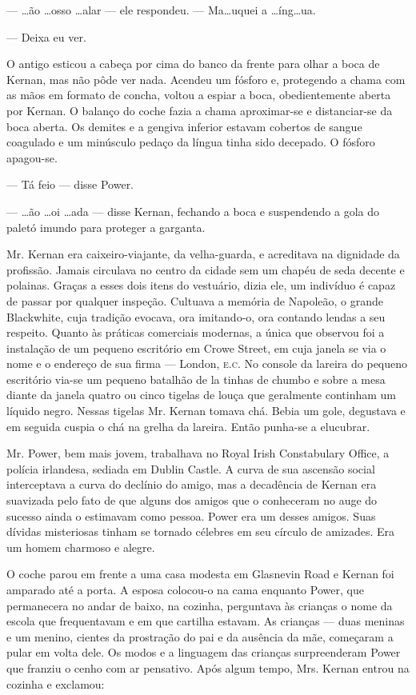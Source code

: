 --- \ldots{}ão \ldots{}osso \ldots{}alar --- ele respondeu. --- Ma\ldots{}uquei a
\ldots{}íng\ldots{}ua.

--- Deixa eu ver.

O antigo esticou a cabeça por cima do banco da frente para olhar a boca
de Kernan, mas não pôde ver nada. Acendeu um fósforo e, protegendo a
chama com as mãos em formato de concha, voltou a espiar a boca,
obedientemente aberta por Kernan. O balanço do coche fazia a chama
aproximar-se e distanciar-se da boca aberta. Os demites e a gengiva
inferior estavam cobertos de sangue coagulado e um minúsculo pedaço da
língua tinha sido decepado. O fósforo apagou-se.

--- Tá feio --- disse Power.

--- \ldots{}ão \ldots{}oi \ldots{}ada --- disse Kernan, fechando a boca e
suspendendo a gola do paletó imundo para proteger a garganta.

Mr. Kernan era caixeiro-viajante, da velha-guarda, e acreditava na
dignidade da profissão. Jamais circulava no centro da cidade sem um
chapéu de seda decente e polainas. Graças a esses dois itens do
vestuário, dizia ele, um indivíduo é capaz de passar por qualquer
inspeção. Cultuava a memória de Napoleão, o grande Blackwhite, cuja
tradição evocava, ora imitando-o, ora contando lendas a seu respeito.
Quanto às práticas comerciais modernas, a
única que observou foi a instalação de um pequeno escritório em Crowe
Street, em cuja janela se via o nome e o endereço de sua firma ---
London, \textsc{e.c.} No console da lareira do pequeno escritório via-se um
pequeno batalhão de la tinhas de chumbo e sobre a mesa diante da
janela quatro ou cinco tigelas de louça que geralmente continham um
líquido negro. Nessas tigelas Mr. Kernan tomava chá. Bebia um gole,
degustava e em seguida cuspia o chá na grelha da lareira. Então
punha-se a elucubrar.

Mr. Power, bem mais jovem, trabalhava no Royal Irish
Constabulary Office, a polícia irlandesa, sediada em Dublin
Castle. A curva de sua ascensão social interceptava a curva
do declínio do amigo, mas a decadência de Kernan era
suavizada pelo fato de que alguns dos amigos que o conheceram
no auge do sucesso ainda o estimavam como pessoa. Power era um
desses amigos. Suas dívidas misteriosas tinham se tornado
célebres em seu círculo de amizades. Era um homem charmoso e
alegre.

O coche parou em frente a uma casa modesta em Glasnevin Road e Kernan
foi amparado até a porta. A esposa colocou-o na cama enquanto Power,
que permanecera no andar de baixo, na cozinha, perguntava às crianças
o nome da escola que frequentavam e em que cartilha estavam. As
crianças --- duas meninas e um menino, cientes da prostração do pai e
da ausência da mãe, começaram a pular em volta dele. Os modos e a
linguagem das crianças surpreenderam Power que franziu o cenho com ar
pensativo. Após algum tempo, Mrs. Kernan entrou na cozinha e
exclamou:

